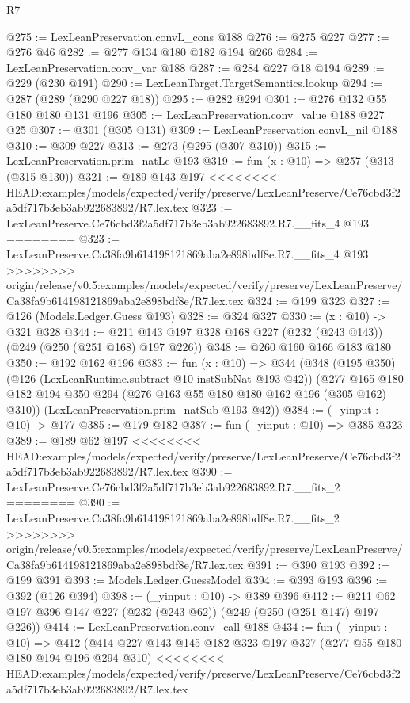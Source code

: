 \begin{lexlean}{R7}
\begin{coremodule}
{{{{{{{{{{{{{@275 := LexLeanPreservation.convL_cons @188
@276 := @275 @227
@277 := @276 @46
@282 := @277 @134 @180 @182 @194 @266
@284 := LexLeanPreservation.conv_var @188
@287 := @284 @227 @18 @194
@289 := @229 (@230 @191)
@290 := LexLeanTarget.TargetSemantics.lookup
@294 := @287 (@289 (@290 @227 @18))
@295 := @282 @294
@301 := @276 @132 @55 @180 @180 @131 @196
@305 := LexLeanPreservation.conv_value @188 @227 @25
@307 := @301 (@305 @131)
@309 := LexLeanPreservation.convL_nil @188
@310 := @309 @227
@313 := @273 (@295 (@307 @310))
@315 := LexLeanPreservation.prim_natLe @193
@319 := fun (x : @10) => @257 (@313 (@315 @130))
@321 := @189 @143 @197
<<<<<<<< HEAD:examples/models/expected/verify/preserve/LexLeanPreserve/Ce76cbd3f2a5df717b3eb3ab922683892/R7.lex.tex
@323 := LexLeanPreserve.Ce76cbd3f2a5df717b3eb3ab922683892.R7.__fits_4 @193
========
@323 := LexLeanPreserve.Ca38fa9b614198121869aba2e898bdf8e.R7.__fits_4 @193
>>>>>>>> origin/release/v0.5:examples/models/expected/verify/preserve/LexLeanPreserve/Ca38fa9b614198121869aba2e898bdf8e/R7.lex.tex
@324 := @199 @323
@327 := @126 (Models.Ledger.Guess @193)
@328 := @324 @327
@330 := (x : @10) -> @321 @328
@344 := @211 @143 @197 @328 @168 @227 (@232 (@243 @143)) (@249 (@250 (@251 @168) @197 @226))
@348 := @260 @160 @166 @183 @180
@350 := @192 @162 @196
@383 := fun (x : @10) =>
  @344
    (@348
      (@195 @350)
      (@126 (LexLeanRuntime.subtract @10 instSubNat @193 @42))
      (@277 @165 @180 @182 @194 @350 @294 (@276 @163 @55 @180 @180 @162 @196 (@305 @162) @310))
      (LexLeanPreservation.prim_natSub @193 @42))
@384 := (_yinput : @10) -> @177
@385 := @179 @182
@387 := fun (_yinput : @10) => @385 @323
@389 := @189 @62 @197
<<<<<<<< HEAD:examples/models/expected/verify/preserve/LexLeanPreserve/Ce76cbd3f2a5df717b3eb3ab922683892/R7.lex.tex
@390 := LexLeanPreserve.Ce76cbd3f2a5df717b3eb3ab922683892.R7.__fits_2
========
@390 := LexLeanPreserve.Ca38fa9b614198121869aba2e898bdf8e.R7.__fits_2
>>>>>>>> origin/release/v0.5:examples/models/expected/verify/preserve/LexLeanPreserve/Ca38fa9b614198121869aba2e898bdf8e/R7.lex.tex
@391 := @390 @193
@392 := @199 @391
@393 := Models.Ledger.GuessModel
@394 := @393 @193
@396 := @392 (@126 @394)
@398 := (_yinput : @10) -> @389 @396
@412 := @211 @62 @197 @396 @147 @227 (@232 (@243 @62)) (@249 (@250 (@251 @147) @197 @226))
@414 := LexLeanPreservation.conv_call @188
@434 := fun (_yinput : @10) =>
  @412
    (@414
      @227
      @143
      @145
      @182
      @323
      @197
      @327
      (@277 @55 @180 @180 @194 @196 @294 @310)
<<<<<<<< HEAD:examples/models/expected/verify/preserve/LexLeanPreserve/Ce76cbd3f2a5df717b3eb3ab922683892/R7.lex.tex
}}}}}}}}}}}}}
\end{coremodule}
\end{lexlean}
